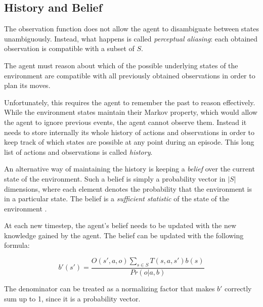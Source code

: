 %

\subsection{History and Belief}

The observation function does not allow the agent to disambiguate between states unambiguously.
Instead, what happens is called \textit{perceptual aliasing}: each obtained observation is
compatible with a subset of $S$.

The agent must reason about which of the possible underlying states of the environment are
compatible with all previously obtained observations in order to plan its moves.

Unfortunately, this requires the agent to remember the past to reason effectively. While the
environment states maintain their Markov property, which would allow the agent to ignore previous
events, the agent cannot observe them. Instead it needs to store internally its whole history of
actions and observations in order to keep track of which states are possible at any point during an
episode. This long list of actions and observations is called \textit{history}.

An alternative way of maintaining the history is keeping a \textit{belief} over the current state of
the environment. Such a belief is simply a probability vector in $|S|$ dimensions, where each
element denotes the probability that the environment is in a particular state. The belief is a
\textit{sufficient statistic} of the state of the environment \cite{pomdp}.

At each new timestep, the agent's belief needs to be updated with the new knowledge gained by the
agent. The belief can be updated with the following formula:

\begin{equation}
 b'(s') = \frac{O(s', a, o)\sum_{s\in S}T(s,a,s')b(s)}{Pr(o|a,b)}
\end{equation}

The denominator can be treated as a normalizing factor that makes $b'$ correctly sum up to 1, since
it is a probability vector.

